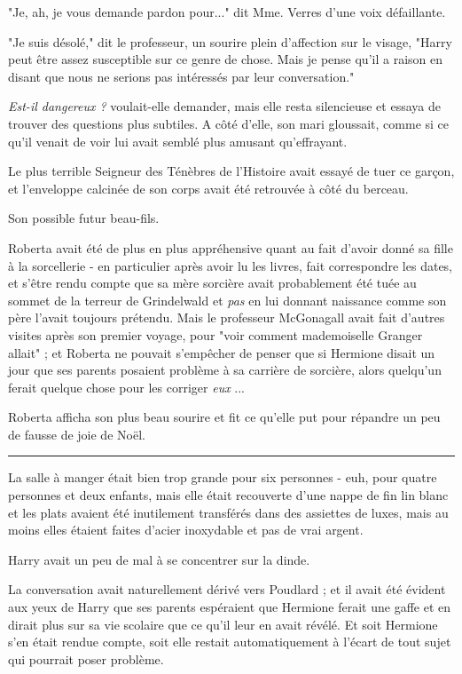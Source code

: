 "Je, ah, je vous demande pardon pour..." dit Mme. Verres d'une voix défaillante.

"Je suis désolé," dit le professeur, un sourire plein d'affection sur le visage, "Harry peut être assez susceptible sur ce genre de chose. Mais je pense qu'il a raison en disant que nous ne serions pas intéressés par leur conversation."

\emph{Est-il dangereux ?}  voulait-elle demander, mais elle resta silencieuse et essaya de trouver des questions plus subtiles. A côté d'elle, son mari gloussait, comme si ce qu'il venait de voir lui avait semblé plus amusant qu'effrayant.

Le plus terrible Seigneur des Ténèbres de l'Histoire avait essayé de tuer ce garçon, et l'enveloppe calcinée de son corps avait été retrouvée à côté du berceau.

Son possible futur beau-fils.

Roberta avait été de plus en plus appréhensive quant au fait d'avoir donné sa fille à la sorcellerie - en particulier après avoir lu les livres, fait correspondre les dates, et s'être rendu compte que sa mère sorcière avait probablement été tuée au sommet de la terreur de Grindelwald et \emph{pas}  en lui donnant naissance comme son père l'avait toujours prétendu. Mais le professeur McGonagall avait fait d'autres visites après son premier voyage, pour "voir comment mademoiselle Granger allait" ; et Roberta ne pouvait s'empêcher de penser que si Hermione disait un jour que ses parents posaient problème à sa carrière de sorcière, alors quelqu'un ferait quelque chose pour les corriger \emph{eux} ...

Roberta afficha son plus beau sourire et fit ce qu'elle put pour répandre un peu de fausse de joie de Noël.
\par\noindent\rule{\textwidth}{0.4pt}
La salle à manger était bien trop grande pour six personnes - euh, pour quatre personnes et deux enfants, mais elle était recouverte d'une nappe de fin lin blanc et les plats avaient été inutilement transférés dans des assiettes de luxes, mais au moins elles étaient faites d'acier inoxydable et pas de vrai argent.

Harry avait un peu de mal à se concentrer sur la dinde.

La conversation avait naturellement dérivé vers Poudlard ; et il avait été évident aux yeux de Harry que ses parents espéraient que Hermione ferait une gaffe et en dirait plus sur sa vie scolaire que ce qu'il leur en avait révélé. Et soit Hermione s'en était rendue compte, soit elle restait automatiquement à l'écart de tout sujet qui pourrait poser problème.

